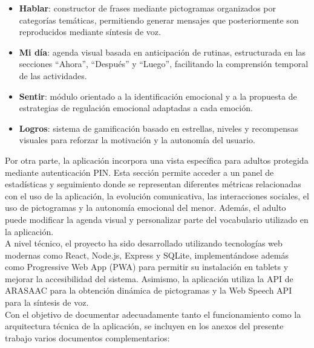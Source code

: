 \documentclass{article}
\begin{document}
\begin{itemize}
    \item \textbf{Hablar}: constructor de frases mediante pictogramas organizados por categorías temáticas, permitiendo generar mensajes que posteriormente son reproducidos mediante síntesis de voz.
    
    \item \textbf{Mi día}: agenda visual basada en anticipación de rutinas, estructurada en las secciones ``Ahora'', ``Después'' y ``Luego'', facilitando la comprensión temporal de las actividades.
    
    \item \textbf{Sentir}: módulo orientado a la identificación emocional y a la propuesta de estrategias de regulación emocional adaptadas a cada emoción.
    
    \item \textbf{Logros}: sistema de gamificación basado en estrellas, niveles y recompensas visuales para reforzar la motivación y la autonomía del usuario.
\end{itemize}

Por otra parte, la aplicación incorpora una vista específica para adultos protegida mediante autenticación PIN. Esta sección permite acceder a un panel de estadísticas y seguimiento donde se representan diferentes métricas relacionadas con el uso de la aplicación, la evolución comunicativa, las interacciones sociales, el uso de pictogramas y la autonomía emocional del menor. Además, el adulto puede modificar la agenda visual y personalizar parte del vocabulario utilizado en la aplicación.\\

A nivel técnico, el proyecto ha sido desarrollado utilizando tecnologías web modernas como React, Node.js, Express y SQLite, implementándose además como Progressive Web App (PWA) para permitir su instalación en tablets y mejorar la accesibilidad del sistema. Asimismo, la aplicación utiliza la API de ARASAAC para la obtención dinámica de pictogramas y la Web Speech API para la síntesis de voz.\\

Con el objetivo de documentar adecuadamente tanto el funcionamiento como la arquitectura técnica de la aplicación, se incluyen en los anexos del presente trabajo varios documentos complementarios:
\end{document}
